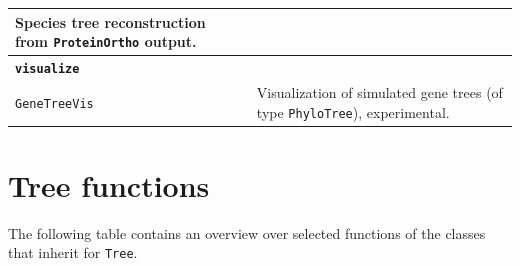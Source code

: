 \documentclass[hidelinks,11pt]{article}
\begin{document}
{\begin{longtable}{| p{4.0cm} | p{10cm} |}
	Species tree reconstruction from \texttt{ProteinOrtho} \cite{lechner2011,lechner2014} output. \\
	\hline
	\multicolumn{2}{|l|}{\textbf{\texttt{visualize}}}\\
	\hline
	\texttt{GeneTreeVis} &
	Visualization of simulated gene trees (of type \texttt{PhyloTree}), experimental. \\
\end{longtable}
}


\section{Tree functions}\label{apx:tree-functions}

The following table contains an overview over selected functions of the classes 
that inherit for \texttt{Tree}.
\end{document}
